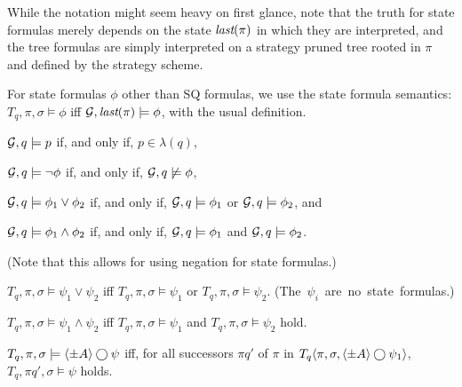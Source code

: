While the notation might seem heavy on first glance, note that the truth for state formulas merely depends on the state $\textit{last}(\pi)$ in which they are interpreted, and the tree formulas are simply interpreted on a strategy pruned tree rooted in $\pi$ and defined by the strategy scheme.
\begin{list1}
\item For state formulas $\phi$ other than SQ formulas,
  we use the state formula semantics:
$T_q,\pi,\sigma\models \phi$ iff ${\cal G},\textit{last}(\pi) \models \phi$, 
with the usual definition.  
\begin{list2}
\item  ${\cal G},q \models p$ if, and only if, $p\in\lambda(q)$,
\item  ${\cal G},q \models \neg \phi$ if, and only if, ${\cal G},q \not\models \phi$,
\item  ${\cal G},q \models \phi_1 \vee \phi_2$ if, and only if, ${\cal G},q \models \phi_1$ or ${\cal G},q \models \phi_2$, and
\item  ${\cal G},q \models \phi_1 \wedge \phi_2$ if, and only if, ${\cal G},q \models \phi_1$ and ${\cal G},q \models \phi_2$.
\end{list2}
(Note that this allows for using negation for state formulas.)

\item $T_q,\pi,\sigma \models \psi_1\vee\psi_2$ iff
    $T_q,\pi,\sigma \models \psi_1$
    or $T_q,\pi,\sigma \models \psi_2$.
     \mbox{(The $\psi_i$ are no state formulas.)}
\item $T_q,\pi,\sigma\models \psi_1\wedge\psi_2$ iff
    $T_q,\pi,\sigma\models \psi_1$
    and $T_q,\pi,\sigma\models \psi_2$ hold.
    
\item $T_q,\pi,\sigma\models \langle \pm A \rangle \bigcirc \psi$ iff,
     for all successors $\pi q'$ of $\pi$ 
     in $T_q\langle \pi,\sigma,\langle \pm A \rangle\bigcirc\psi_1\rangle$, 
     $T_q,\pi q',\sigma \models \psi$ holds.  
    

\end{list1}
